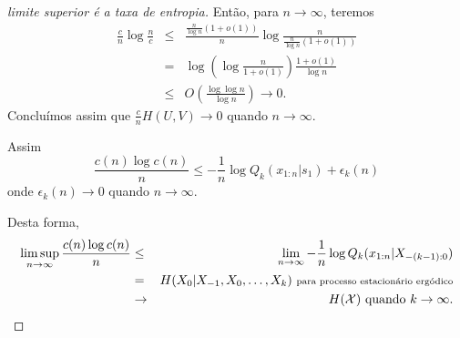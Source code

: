 \begin{frame}[allowframebreaks]
\begin{proof}[limite superior é a taxa de entropia]
  \proofbreak
  Então, para $n \rightarrow \infty$, teremos 
  \begin{eqnarray}
  \frac{c}{n} \log \frac{n}{c} &\leq& \frac{\frac{n}{\log n} (1 + o(1))}{n} \log \frac{n}{\frac{n}{\log n} (1 + o(1))} \nonumber \\
	&=& \log \left( \log \frac{n}{1 + o(1)} \right) \frac{1 + o(1)}{\log n} \nonumber \\
	&\leq& O \left( \frac{\log \log n}{\log n} \right) \rightarrow 0 .
  \end{eqnarray}
  Concluímos assim que $\frac{c}{n} H(U,V) \rightarrow 0$ quando $n \rightarrow \infty$.

  \proofbreak
  Assim
  \begin{equation}
  \frac{c(n) \log c(n)}{n} \leq - \frac{1}{n} \log Q_k(x_{1:n}|s_1) + \epsilon_k(n)
  \end{equation}
  onde $\epsilon_k(n) \rightarrow 0$ quando $n \rightarrow \infty$.

  Desta forma,
  \begin{eqnarray}
   \limsup_{n \rightarrow \infty} \frac{c(n) \log c(n)}{n} &\leq& \lim_{n \rightarrow \infty} - \frac{1}{n} \log Q_k(x_{1:n}|X_{-(k-1):0}) \nonumber \\
	&=& H(X_0 | X_{-1}, X_{0}, \ldots, X_k)  \text{ \scriptsize para processo estacionário ergódico} \nonumber \\
	&\rightarrow& H(\mathcal{X}) \text{ quando } k \rightarrow \infty .
  \end{eqnarray}

  \end{proof}
\end{frame}



